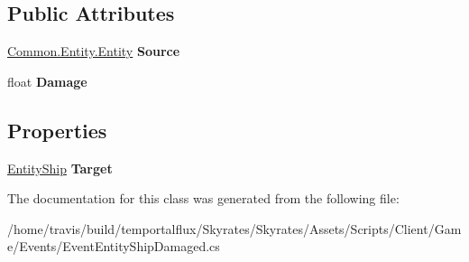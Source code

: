 \subsection*{Public Attributes}
\begin{DoxyCompactItemize}
\item 
\hypertarget{class_skyrates_1_1_client_1_1_game_1_1_event_1_1_event_entity_ship_damaged_a4cd32fb813a20f289425daf9c964d692}{\hyperlink{class_skyrates_1_1_common_1_1_entity_1_1_entity}{Common.\-Entity.\-Entity} {\bfseries Source}}\label{class_skyrates_1_1_client_1_1_game_1_1_event_1_1_event_entity_ship_damaged_a4cd32fb813a20f289425daf9c964d692}

\item 
\hypertarget{class_skyrates_1_1_client_1_1_game_1_1_event_1_1_event_entity_ship_damaged_a1e4d02b92dcb9e8b957e70c7857d96d7}{float {\bfseries Damage}}\label{class_skyrates_1_1_client_1_1_game_1_1_event_1_1_event_entity_ship_damaged_a1e4d02b92dcb9e8b957e70c7857d96d7}

\end{DoxyCompactItemize}
\subsection*{Properties}
\begin{DoxyCompactItemize}
\item 
\hypertarget{class_skyrates_1_1_client_1_1_game_1_1_event_1_1_event_entity_ship_damaged_abfb55cdb6205f8e4ecf35b8c93ae39b6}{\hyperlink{class_skyrates_1_1_common_1_1_entity_1_1_entity_ship}{Entity\-Ship} {\bfseries Target}}\label{class_skyrates_1_1_client_1_1_game_1_1_event_1_1_event_entity_ship_damaged_abfb55cdb6205f8e4ecf35b8c93ae39b6}

\end{DoxyCompactItemize}


The documentation for this class was generated from the following file\-:\begin{DoxyCompactItemize}
\item 
/home/travis/build/temportalflux/\-Skyrates/\-Skyrates/\-Assets/\-Scripts/\-Client/\-Game/\-Events/Event\-Entity\-Ship\-Damaged.\-cs\end{DoxyCompactItemize}

